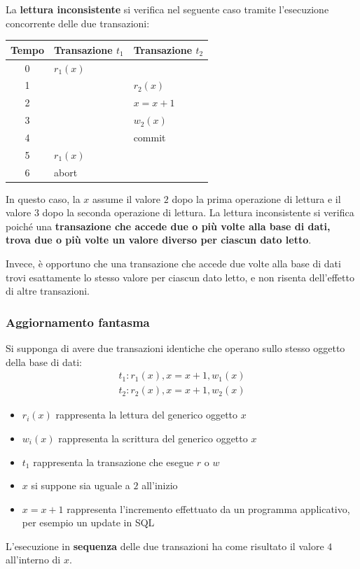 \documentclass[a4paper]{article}
\begin{document}
	\noindent
	La \textcolor{Red3}{\textbf{lettura inconsistente}} si verifica nel seguente caso tramite l'esecuzione concorrente delle due transazioni:
	\begin{table}[!htbp]
		\centering
		\begin{tabular}{@{} c l l @{}}
			\toprule
			Tempo & Transazione $t_{1}$ & Transazione $t_{2}$ \\
			\midrule
			0	& $r_{1}\left(x\right)$			& \\
			1	&								& $r_{2}\left(x\right)$ \\
			2	& 								& $x = x + 1$ \\
			3	& 								& $w_{2}\left(x\right)$ \\
			4	&								& \textsf{commit} \\
			5	& $r_{1}\left(x\right)$			& \\
			6	& \textsf{abort}				& \\
			\bottomrule
		\end{tabular}
	\end{table}
	
	\noindent
	In questo caso, la $x$ assume il valore $2$ dopo la prima operazione di lettura e il valore $3$ dopo la seconda operazione di lettura. La lettura inconsistente si verifica poiché una \textbf{transazione che accede due o più volte alla base di dati, trova due o più volte un valore diverso per ciascun dato letto}.\newline
	
	\noindent
	Invece, è opportuno che una transazione che accede due volte alla base di dati trovi esattamente lo stesso valore per ciascun dato letto, e non risenta dell'effetto di altre transazioni.\newpage
	
	\subsubsection{Aggiornamento fantasma}\label{aggiornamento fantasma}
	
	Si supponga di avere due transazioni identiche che operano sullo stesso oggetto della base di dati:
	\begin{gather*}
		t_{1} : r_{1}\left(x\right), x = x + 1, w_{1}\left(x\right) \\
		t_{2} : r_{2}\left(x\right), x = x + 1, w_{2}\left(x\right)
	\end{gather*}
	\begin{itemize}
		\item $r_{i}\left(x\right)$ rappresenta la lettura del generico oggetto $x$
		\item $w_{i}\left(x\right)$ rappresenta la scrittura del generico oggetto $x$
		\item $t_{1}$ rappresenta la transazione che esegue $r$ o $w$
		\item $x$ si suppone sia uguale a $2$ all'inizio
		\item $x = x+1$ rappresenta l'incremento effettuato da un programma applicativo, per esempio un \textsf{update} in SQL
	\end{itemize}
	L'esecuzione in \textbf{sequenza} delle due transazioni ha come risultato il valore $4$ all'interno di $x$.\newline
	
\end{document}
